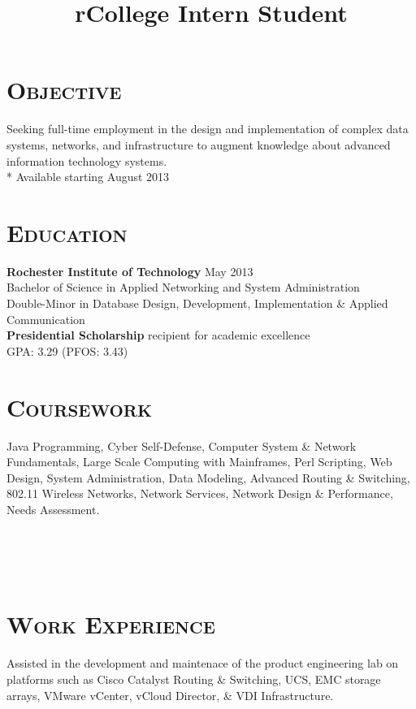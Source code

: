 \begin{resume}


\section{\textsc{Objective}}
Seeking full-time employment in the design and implementation of complex data systems, networks, and infrastructure to augment knowledge about advanced information technology systems. \\*
Available starting August 2013
\section{\textsc{Education}}

\textbf{Rochester Institute of Technology} \hfill May 2013 \\
Bachelor of Science in Applied Networking and System Administration \\
Double-Minor in Database Design, Development, Implementation \& Applied Communication \\
{\bf Presidential Scholarship} recipient for academic excellence \\
GPA: 3.29 (PFOS: 3.43)

\section{\textsc{Coursework}}

Java Programming, Cyber Self-Defense, Computer System \& Network Fundamentals, Large Scale Computing with Mainframes, Perl Scripting, Web Design, System Administration, Data Modeling, Advanced Routing \& Switching, 802.11 Wireless Networks, Network Services, Network Design \& Performance, Needs Assessment.

\begin{formatb}
  \title{r}\\
  \\
  \body\\
\end{formatb}

\section{\textsc{Work Experience}}

\title{College Intern Student}
\begin{position}
Assisted in the development and maintenace of the product engineering lab on platforms such as Cisco Catalyst Routing \& Switching, UCS, EMC storage arrays, VMware vCenter, vCloud Director, \& VDI Infrastructure.
\end{position}


\end{resume}
